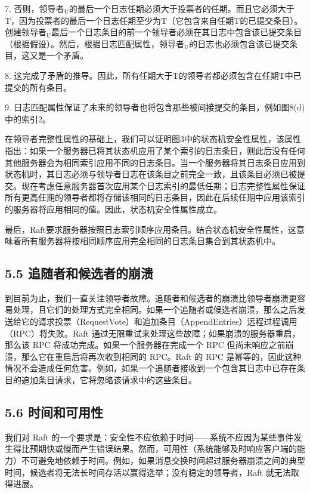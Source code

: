 \documentclass[12pt,a4paper]{report} %
\begin{document}
7. 否则，领导者${ }_{\mathrm{U}}$的最后一个日志任期必须大于投票者的任期。而且它必须大于T，因为投票者的最后一个日志任期至少为T（它包含来自任期T的已提交条目）。创建领导者${ }_{\mathrm{U}}$最后一个日志条目的前一个领导者必须在其日志中包含该已提交条目（根据假设）。然后，根据日志匹配属性，领导者${ }_{\mathrm{U}}$的日志也必须包含该已提交条目，这又是一个矛盾。

8. 这完成了矛盾的推导。因此，所有任期大于T的领导者都必须包含在任期T中已提交的所有条目。

9. 日志匹配属性保证了未来的领导者也将包含那些被间接提交的条目，例如图8(d)中的索引2。

在领导者完整性属性的基础上，我们可以证明图3中的状态机安全性属性，该属性指出：如果一个服务器已将其状态机应用了某个索引的日志条目，则此后没有任何其他服务器会为相同索引应用不同的日志条目。当一个服务器将其日志条目应用到状态机时，其日志必须与领导者日志在该条目之前完全一致，且该条目必须已被提交。现在考虑任意服务器首次应用某个日志索引的最低任期；日志完整性属性保证所有更高任期的领导者都将存储该相同的日志条目，因此在后续任期中应用该索引的服务器将应用相同的值。因此，状态机安全性属性成立。

最后，Raft要求服务器按照日志索引顺序应用条目。结合状态机安全性属性，这意味着所有服务器将按相同顺序应用完全相同的日志条目集合到其状态机中。
\subsection*{5.5 追随者和候选者的崩溃}

到目前为止，我们一直关注领导者故障。追随者和候选者的崩溃比领导者崩溃更容易处理，且它们的处理方式完全相同。如果一个追随者或候选者崩溃，那么之后发送给它的请求投票（RequestVote）和追加条目（AppendEntries）远程过程调用（RPC）将失败。Raft 通过无限重试来处理这些故障；如果崩溃的服务器重启，那么该 RPC 将成功完成。如果一个服务器在完成一个 RPC 但尚未响应之前崩溃，那么它在重启后将再次收到相同的 RPC。Raft 的 RPC 是幂等的，因此这种情况不会造成任何危害。例如，如果一个追随者接收到一个包含其日志中已存在条目的追加条目请求，它将忽略该请求中的这些条目。

\subsection*{5.6 时间和可用性}

我们对 Raft 的一个要求是：安全性不应依赖于时间——系统不应因为某些事件发生得比预期快或慢而产生错误结果。然而，可用性（系统能够及时响应客户端的能力）不可避免地依赖于时间。例如，如果消息交换时间超过服务器崩溃之间的典型时间，候选者将无法长时间存活以赢得选举；没有稳定的领导者，Raft 就无法取得进展。
\end{document}
